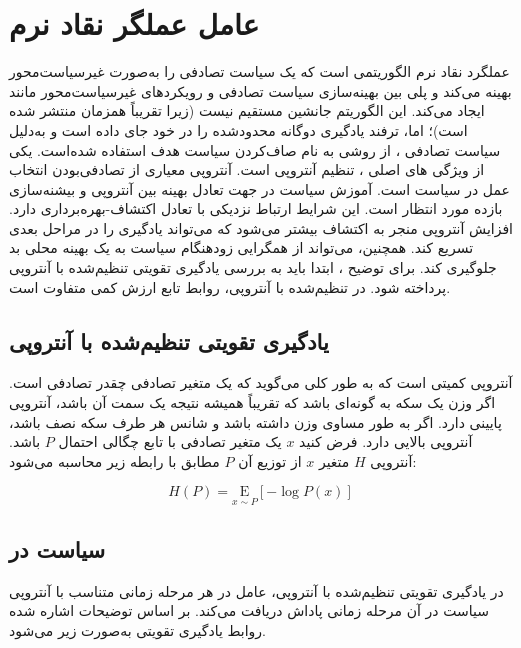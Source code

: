 \section{عامل عملگر نقاد نرم}\label{sec:SAC}
عملگرد نقاد نرم
 الگوریتمی است که یک سیاست تصادفی را به‌صورت  غیرسیاست‌محور بهینه می‌کند و پلی بین بهینه‌سازی سیاست تصادفی و رویکردهای غیرسیاست‌محور 
  مانند
  ایجاد می‌کند. این الگوریتم جانشین مستقیم 
  نیست (زیرا تقریباً همزمان منتشر شده است)؛ اما، ترفند یادگیری دوگانه محدود‌شده را در خود جای داده است و به‌دلیل سیاست تصادفی ، از روشی به نام صاف‌کردن سیاست هدف
    استفاده شده‌است.
یکی از ویژگی های اصلی ، تنظیم آنتروپی است.
آنتروپی معیاری از تصادفی‌بودن انتخاب عمل در سیاست است.
 آموزش سیاست در جهت تعادل بهینه بین آنتروپی و بیشنه‌سازی  بازده مورد انتظار است.
  این شرایط ارتباط نزدیکی با تعادل اکتشاف-بهره‌برداری دارد. افزایش آنتروپی منجر به اکتشاف بیشتر می‌شود که می‌تواند یادگیری را در مراحل بعدی تسریع کند. همچنین، می‌تواند از همگرایی زودهنگام سیاست به یک بهینه محلی بد جلوگیری کند.
 برای توضیح ، ابتدا باید به بررسی یادگیری تقویتی تنظیم‌شده با آنتروپی
  پرداخته شود. در  تنظیم‌شده با آنتروپی، روابط تابع ارزش کمی متفاوت است.
 
\subsection{یادگیری تقویتی تنظیم‌شده با آنتروپی}
 آنتروپی کمیتی است که به طور کلی می‌گوید که یک متغیر تصادفی چقدر تصادفی است. اگر وزن یک سکه به گونه‌ای باشد که تقریباً همیشه نتیجه یک سمت آن باشد، آنتروپی پایینی دارد. اگر به طور مساوی وزن داشته باشد و شانس هر طرف سکه نصف باشد، آنتروپی بالایی دارد.
 فرض کنید \(x\) یک متغیر تصادفی با تابع چگالی احتمال
\(  P\)
   باشد. آنتروپی
\(    H\)
     متغیر \(x\) از توزیع آن
      \(P\)
       مطابق با رابطه زیر محاسبه می‌شود:
      
      \begin{equation}
      	H(P) =  \underset{x \sim P} {\mathrm E} \left[  {-\log P(x)}  \right]
      \end{equation}
      
      
       \subsection{سیاست در }
       در یادگیری تقویتی تنظیم‌شده با آنتروپی، عامل در هر مرحله زمانی متناسب با آنتروپی سیاست در آن مرحله زمانی پاداش دریافت می‌کند. بر اساس توضیحات اشاره شده روابط یادگیری تقویتی به‌صورت زیر می‌شود.
       
